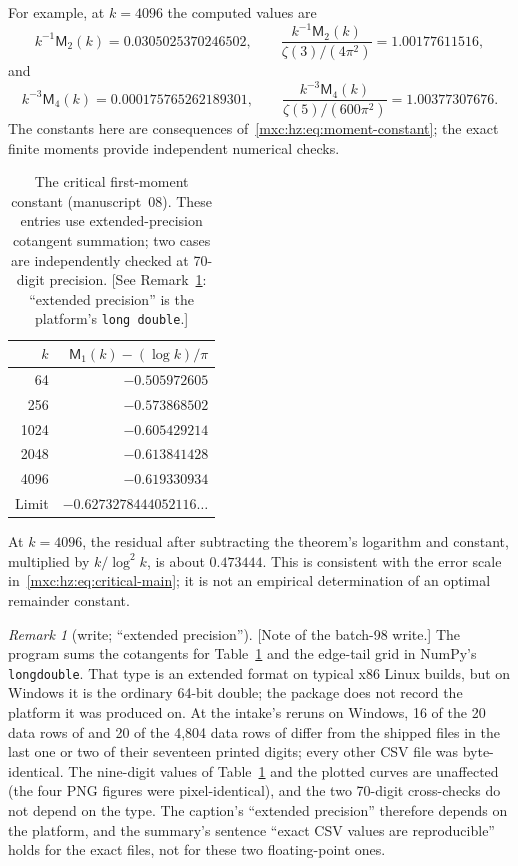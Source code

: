 \documentclass[11pt]{article}
\numberwithin{equation}{section}
\theoremstyle{definition}
\theoremstyle{remark}
\newtheorem{remark}[theorem]{Remark}
\begin{document}
For example, at $k=4096$ the computed values are
\[
 k^{-1}\mathsf M_2(k)=0.0305025370246502,\qquad
 \frac{k^{-1}\mathsf M_2(k)}{\zeta(3)/(4\pi^2)}=1.00177611516,
\]
and
\[
 k^{-3}\mathsf M_4(k)=0.000175765262189301,\qquad
 \frac{k^{-3}\mathsf M_4(k)}{\zeta(5)/(600\pi^2)}=1.00377307676.
\]
The constants here are consequences of~\eqref{mxc:hz:eq:moment-constant};
the exact finite moments provide independent numerical checks.

\begin{table}[htbp]
\centering\small
\begin{tabular}{@{}rr@{}}
\toprule
$k$&$\mathsf M_1(k)-(\log k)/\pi$\\
\midrule
64&$-0.505972605$\\
256&$-0.573868502$\\
1024&$-0.605429214$\\
2048&$-0.613841428$\\
4096&$-0.619330934$\\
\midrule
Limit&$-0.6273278444052116\ldots$\\
\bottomrule
\end{tabular}
\caption{The critical first-moment constant (manuscript~08). These entries
use extended-precision cotangent summation; two cases are independently
checked at 70-digit precision. [See Remark~\ref{mxc:hz:rem:longdouble}:
``extended precision'' is the platform's \texttt{long double}.]}
\label{mxc:hz:tab:first-moment}
\end{table}

At $k=4096$, the residual after subtracting the theorem's logarithm and
constant, multiplied by $k/\log^2k$, is about $0.473444$. This is
consistent with the error scale in~\eqref{mxc:hz:eq:critical-main}; it is
not an empirical determination of an optimal remainder constant.

\begin{remark}[write; ``extended precision'']\label{mxc:hz:rem:longdouble}
[Note of the batch-98 write.] The program sums the cotangents for
Table~\ref{mxc:hz:tab:first-moment} and the edge-tail grid in NumPy's
\texttt{longdouble}. That type is an extended format on typical x86 Linux
builds, but on Windows it is the ordinary 64-bit double; the package does
not record the platform it was produced on. At the intake's reruns on
Windows, 16 of the 20
data rows of  and 20 of
the 4,804 data rows of  differ
from the shipped files in the last one or two of their seventeen printed
digits; every other CSV file was byte-identical. The nine-digit values of
Table~\ref{mxc:hz:tab:first-moment} and the plotted curves are unaffected
(the four PNG figures were pixel-identical), and the two 70-digit
cross-checks do not depend on the type. The caption's ``extended
precision'' therefore depends on the platform, and the summary's sentence
``exact CSV values are reproducible'' holds for the exact files, not for
these two floating-point ones.
\end{remark}
\end{document}
